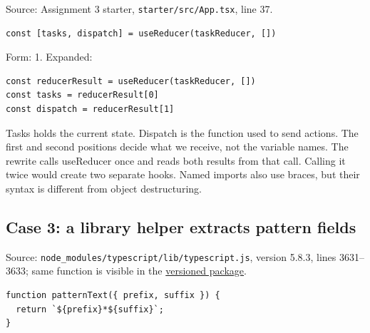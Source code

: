 \documentclass[
  10pt,
  a4paper,
]{article}
\begin{document}
Source: Assignment 3 starter,
\texttt{starter/\allowbreak{}src/\allowbreak{}App.\allowbreak{}tsx},
line 37.

\begin{minipage}{\linewidth}

\begin{lstlisting}
const [tasks, dispatch] = useReducer(taskReducer, [])
\end{lstlisting}

\end{minipage}\par

Form: 1. Expanded:

\begin{minipage}{\linewidth}

\begin{lstlisting}
const reducerResult = useReducer(taskReducer, [])
const tasks = reducerResult[0]
const dispatch = reducerResult[1]
\end{lstlisting}

\end{minipage}\par

Tasks holds the current state. Dispatch is the function used to send
actions. The first and second positions decide what we receive, not the
variable names. The rewrite calls useReducer once and reads both results
from that call. Calling it twice would create two separate hooks. Named
imports also use braces, but their syntax is different from object
destructuring.

\subsection{Case 3: a library helper extracts pattern
fields}\label{case-3-a-library-helper-extracts-pattern-fields}

Source:
\texttt{node\_modules/\allowbreak{}typescript/\allowbreak{}lib/\allowbreak{}typescript.\allowbreak{}js},
version 5.8.3, lines 3631--3633; same function is visible in the
\href{https://unpkg.com/typescript@5.8.3/lib/typescript.js}{versioned
package}.

\begin{minipage}{\linewidth}

\begin{lstlisting}
function patternText({ prefix, suffix }) {
  return `${prefix}*${suffix}`;
}
\end{lstlisting}

\end{minipage}\par
\end{document}
